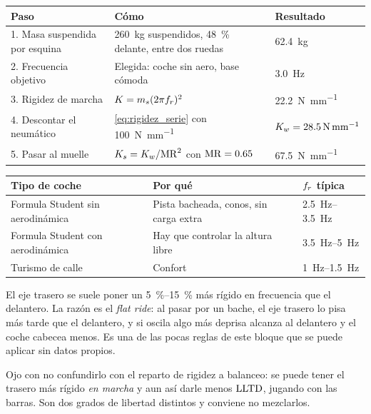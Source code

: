 \begin{center}
\begin{tabularx}{\textwidth}{@{}lXl@{}}
\toprule
\textbf{Paso} & \textbf{Cómo} & \textbf{Resultado} \\
\midrule
1. Masa suspendida por esquina & \SI{260}{\kilogram} suspendidos, \SI{48}{\percent} delante, entre dos ruedas & \SI{62.4}{\kilogram} \\
2. Frecuencia objetivo & Elegida: coche sin aero, base cómoda & \SI{3.0}{\hertz} \\
3. Rigidez de marcha & $K = m_s(2\pi f_r)^2$ & \SI{22.2}{\newton\per\milli\meter} \\
4. Descontar el neumático & \eqref{eq:rigidez_serie} con \SI{100}{\newton\per\milli\meter} & $K_w = \SI{28.5}{\newton\per\milli\meter}$ \\
5. Pasar al muelle & $K_s = K_w/\mathrm{MR}^2$ con $\mathrm{MR} = \num{0.65}$ & \SI{67.5}{\newton\per\milli\meter} \\
\bottomrule
\end{tabularx}
\end{center}

\begin{center}
\begin{tabularx}{\textwidth}{@{}lXl@{}}
\toprule
\textbf{Tipo de coche} & \textbf{Por qué} & \textbf{$f_r$ típica} \\
\midrule
Formula Student sin aerodinámica & Pista bacheada, conos, sin carga extra & \SIrange{2.5}{3.5}{\hertz} \\
Formula Student con aerodinámica & Hay que controlar la altura libre & \SIrange{3.5}{5}{\hertz} \\
Turismo de calle & Confort & \SIrange{1}{1.5}{\hertz} \\
\bottomrule
\end{tabularx}
\end{center}

\begin{clave}
El eje trasero se suele poner un \SIrange{5}{15}{\percent} más rígido en
frecuencia que el delantero. La razón es el \emph{flat ride}: al pasar por un
bache, el eje trasero lo pisa más tarde que el delantero, y si oscila algo más
deprisa alcanza al delantero y el coche cabecea menos. Es una de las pocas
reglas de este bloque que se puede aplicar sin datos propios.

Ojo con no confundirlo con el reparto de rigidez a balanceo: se puede tener el
trasero más rígido \emph{en marcha} y aun así darle menos $\mathrm{LLTD}$, jugando con
las barras. Son dos grados de libertad distintos y conviene no mezclarlos.
\end{clave}

